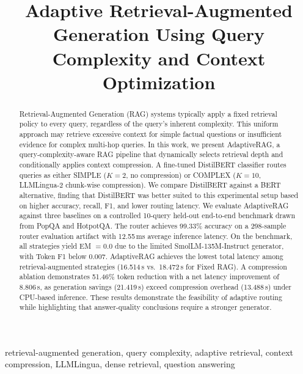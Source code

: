 \documentclass[conference]{IEEEtran}
\begin{document}
\title{Adaptive Retrieval-Augmented Generation Using Query Complexity and Context Optimization}

\author{
}

\maketitle

\begin{abstract}
Retrieval-Augmented Generation (RAG) systems typically apply a fixed retrieval policy to every query, regardless of the query's inherent complexity. This uniform approach may retrieve excessive context for simple factual questions or insufficient evidence for complex multi-hop queries. In this work, we present AdaptiveRAG, a query-complexity-aware RAG pipeline that dynamically selects retrieval depth and conditionally applies context compression. A fine-tuned DistilBERT classifier routes queries as either SIMPLE ($K=2$, no compression) or COMPLEX ($K=10$, LLMLingua-2 chunk-wise compression). We compare DistilBERT against a BERT alternative, finding that DistilBERT was better suited to this experimental setup based on higher accuracy, recall, F1, and lower routing latency. We evaluate AdaptiveRAG against three baselines on a controlled 10-query held-out end-to-end benchmark drawn from PopQA and HotpotQA. The router achieves 99.33\% accuracy on a 298-sample router evaluation artifact with 12.55\,ms average inference latency. On the benchmark, all strategies yield EM $=0.0$ due to the limited SmolLM-135M-Instruct generator, with Token F1 below 0.007. AdaptiveRAG achieves the lowest total latency among retrieval-augmented strategies (16.514\,s vs.\ 18.472\,s for Fixed RAG). A compression ablation demonstrates 51.46\% token reduction with a net latency improvement of 8.806\,s, as generation savings (21.419\,s) exceed compression overhead (13.488\,s) under CPU-based inference. These results demonstrate the feasibility of adaptive routing while highlighting that answer-quality conclusions require a stronger generator.
\end{abstract}

\begin{IEEEkeywords}
retrieval-augmented generation, query complexity, adaptive retrieval, context compression, LLMLingua, dense retrieval, question answering
\end{IEEEkeywords}
\end{document}
